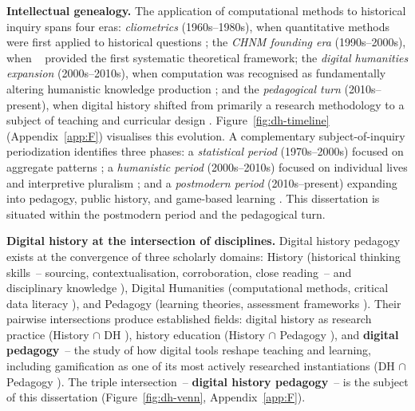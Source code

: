 \textbf{Intellectual genealogy.} \label{subsec:dh-genealogy}
The application of computational methods to historical inquiry spans four eras: \textit{cliometrics} (1960s--1980s), when quantitative methods were first applied to historical questions \cite{Fogel1974}; the \textit{CHNM founding era} (1990s--2000s), when \citeauthor{CohenRosenzweig2006}~\cite{CohenRosenzweig2006} provided the first systematic theoretical framework; the \textit{digital humanities expansion} (2000s--2010s), when computation was recognised as fundamentally altering humanistic knowledge production \cite{Berry2012, Moretti2013, Drucker2011}; and the \textit{pedagogical turn} (2010s--present), when digital history shifted from primarily a research methodology to a subject of teaching and curricular design \cite{Graham20151, Crymble2021, guiliano, ROMEIN, Milligan}. Figure~\ref{fig:dh-timeline} (Appendix~\ref{app:F}) visualises this evolution. A complementary subject-of-inquiry periodization identifies three phases: a \textit{statistical period} (1970s--2000s) focused on aggregate patterns \cite{Fogel1974}; a \textit{humanistic period} (2000s--2010s) focused on individual lives and interpretive pluralism \cite{CohenRosenzweig2006, Graham20151}; and a \textit{postmodern period} (2010s--present) expanding into pedagogy, public history, and game-based learning \cite{Crymble2021, guiliano, ROMEIN}. This dissertation is situated within the postmodern period and the pedagogical turn.

\textbf{Digital history at the intersection of disciplines.} \label{subsec:dh-intersection}
Digital history pedagogy exists at the convergence of three scholarly domains: History (historical thinking skills~-- sourcing, contextualisation, corroboration, close reading~-- and disciplinary knowledge \cite{Wineburg2001, Seixas2013}), Digital Humanities (computational methods, critical data literacy \cite{Berry2012, Drucker2011, Bordalejo2025}), and Pedagogy (learning theories, assessment frameworks \cite{Vygotsky1978, Siemens2004, Hattie2009}). Their pairwise intersections produce established fields: digital history as research practice (History $\cap$ DH \cite{CohenRosenzweig2006, ROMEIN}), history education (History $\cap$ Pedagogy \cite{Wineburg2001, Seixas2013}), and \textbf{digital pedagogy}~-- the study of how digital tools reshape teaching and learning, including gamification as one of its most actively researched instantiations (DH $\cap$ Pedagogy \cite{Vuorikari2016, Voogt20161, Deterding2011}). The triple intersection~-- \textbf{digital history pedagogy}~-- is the subject of this dissertation (Figure~\ref{fig:dh-venn}, Appendix~\ref{app:F}).

